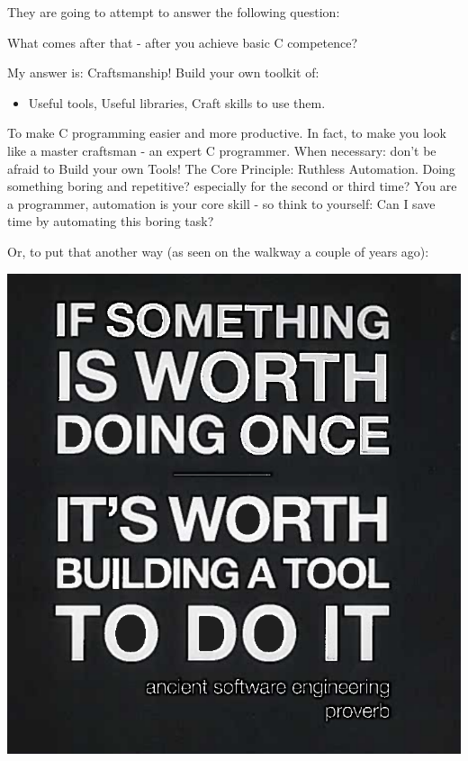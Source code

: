 \documentclass[handout]{beamer}
\begin{document}
\begin{frame}

    \large
    They are going to attempt to answer the following question:
    
    \alert{What comes after that - after you achieve basic C competence?}

    \begin{itemize}
    \pitem
      My answer is: \alert{Craftsmanship!}
    \pitem
      Build your own \alert{toolkit} of:
      \begin{itemize}
      \item
      \alert{Useful tools},
      \pitem
      \alert{Useful libraries},
      \pitem
      \alert{Craft skills} to use them.
      \end{itemize}
    \pitem
      To make C programming easier and more productive.
    \pitem
      In fact, to make you look like a \alert{master craftsman} - an expert C programmer.
    \pitem
      When necessary: don't be afraid to \alert{Build your own Tools!}
    \pitem
      The Core Principle: \alert{Ruthless Automation}.
    \pitem
      Doing something boring and repetitive?
    \pause
      especially for the second or third time?
    \pitem
      You are a \alert{programmer}, automation is your core skill -
      so think to yourself:
      \alert{Can I save time by automating this boring task?}
    \end{itemize}
\end{frame}

\begin{frame}
Or, to put that another way (as seen on the walkway a couple of years ago):

\centering
\vspace{10pt}
\includegraphics[height=0.8\textheight]{Build.png}

\end{frame}
\end{document}
